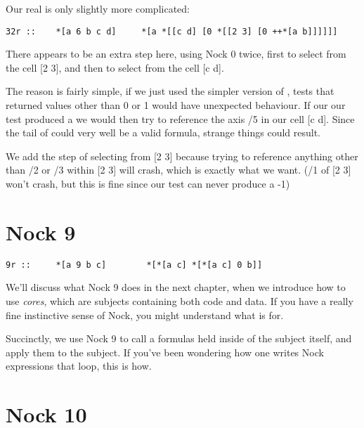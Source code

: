 Our real  is only slightly more complicated:

\begin{framed_shaded}
\begin{Verbatim}[fontsize=\relsize{-2.5},commandchars=\\\{\}]
32r ::    *[a 6 b c d]     *[a *[[c d] [0 *[[2 3] [0 ++*[a b]]]]]]
\end{Verbatim}
\end{framed_shaded}
There appears to be an extra step here, using Nock 0 twice, first to select from the cell [2 3], and then to select from the cell [c d].

The reason is fairly simple, if we just used the simpler version of , tests that returned values other than 0 or 1 would have unexpected behaviour. If our our test produced a  we would then try to reference the axis /5 in our cell [c d]. Since the tail of  could very well be a valid formula, strange things could result.

We add the step of selecting from [2 3] because trying to reference anything other than /2 or /3 within [2 3] will crash, which is exactly what we want. (/1 of [2 3] won't crash, but this is fine since our test can never produce a -1)

\section{Nock 9}

\begin{framed_shaded}
\begin{Verbatim}[fontsize=\relsize{-2.5},commandchars=\\\{\}]
9r ::     *[a 9 b c]        *[*[a c] *[*[a c] 0 b]]
\end{Verbatim}
\end{framed_shaded}
We'll discuss what Nock 9 does in the next chapter, when we introduce how to
use \emph{cores}, which are subjects containing both code and data.  If you have a
really fine instinctive sense of Nock, you might understand what  is for.

Succinctly, we use Nock 9 to call a formulas held inside of the subject itself,
and apply them to the subject. If you've been wondering how one writes Nock
expressions that loop, this is how.

\section{Nock 10}

